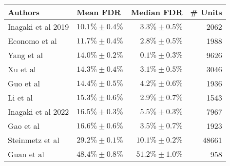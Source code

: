 \documentclass{article}
\begin{document}
	
	
\begin{table}[ht]
	\centering
	\begin{tabular}{llrr}
		\hline
		Authors & Mean FDR & Median FDR & \# Units \\ 
		\hline
		Inagaki et al 2019 & $10.1\% \pm 0.4\%$ & $3.3\% \pm 0.5\%$ & 2062 \\ 
		Economo et al & $11.7\% \pm 0.4\%$ & $2.8\% \pm 0.5\%$ & 1988 \\
		Yang et al & $14.0\% \pm 0.2\%$ & $0.1\% \pm 0.3\%$ & 9626 \\
		Xu et al & $14.3\% \pm 0.4\%$ & $3.1\% \pm 0.5\%$ & 3046 \\  
		Guo et al & $14.4\% \pm 0.5\%$ & $4.2\% \pm 0.6\%$ & 1936 \\
		Li et al & $15.3\% \pm 0.6\%$ & $2.9\% \pm 0.7\%$ & 1543 \\ 
		Inagaki et al 2022 & $16.5\% \pm 0.3\%$ & $5.5\% \pm 0.3\%$ & 7967 \\ 
		Gao et al & $16.6\% \pm 0.6\%$ & $3.5\% \pm 0.7\%$ & 1923 \\
		Steinmetz et al & $29.2\% \pm 0.1\%$ & $10.1\% \pm 0.2\%$ & 48661 \\ 
		Guan et al & $48.4\% \pm 0.8\%$ & $51.2\% \pm 1.0\%$ & 958 \\ 
		\hline
	\end{tabular}
\end{table}
\end{document}
